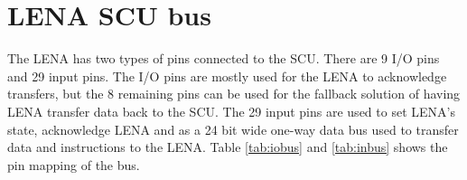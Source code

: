 \section{LENA SCU bus}
\label{app:lena-scu-bus}

The LENA has two types of pins connected to the SCU. There are 9 I/O pins and 29 input pins. The I/O pins are mostly used for the LENA to acknowledge transfers, but the 8 remaining pins can be used for the fallback solution of having LENA transfer data back to the SCU. The 29 input pins are used to set LENA's state, acknowledge LENA and as a 24 bit wide one-way data bus used to transfer data and instructions to the LENA. Table \ref{tab:iobus} and \ref{tab:inbus} shows the pin mapping of the bus.



